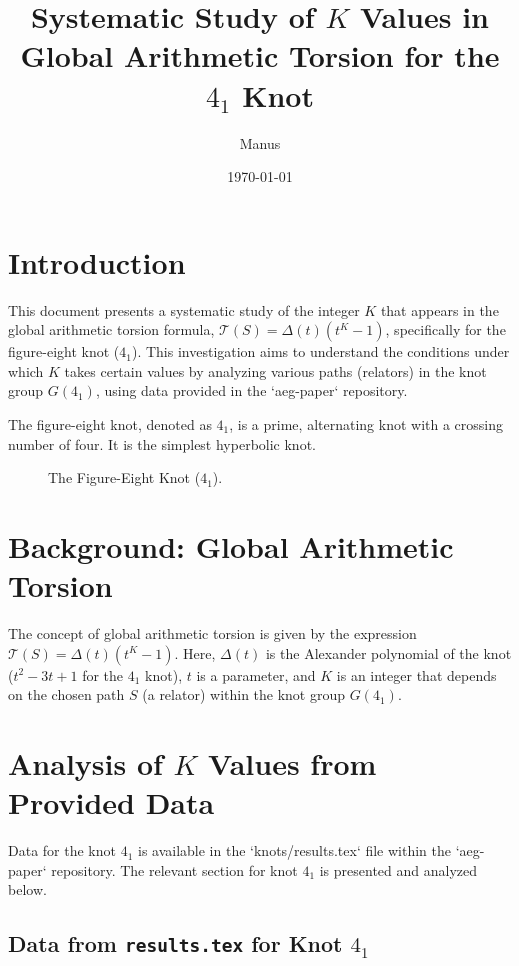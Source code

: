 \documentclass{article}
\title{Systematic Study of $K$ Values in Global Arithmetic Torsion for the $4_1$ Knot}
\author{Manus}
\date{\today}
\begin{document}
\maketitle

\section{Introduction}
This document presents a systematic study of the integer $K$ that appears in the global arithmetic torsion formula, $\mathcal{T}(S) = \Delta(t)(t^K-1)$, specifically for the figure-eight knot ($4_1$). This investigation aims to understand the conditions under which $K$ takes certain values by analyzing various paths (relators) in the knot group $G(4_1)$, using data provided in the `aeg-paper` repository.

The figure-eight knot, denoted as $4_1$, is a prime, alternating knot with a crossing number of four. It is the simplest hyperbolic knot.

\begin{figure}[h!]
    \centering
     
    \caption{The Figure-Eight Knot ($4_1$).}
    \label{fig:knot_4_1}
\end{figure}

\section{Background: Global Arithmetic Torsion}
The concept of global arithmetic torsion is given by the expression $\mathcal{T}(S) = \Delta(t)(t^K-1)$. Here, $\Delta(t)$ is the Alexander polynomial of the knot ($t^2 - 3t + 1$ for the $4_1$ knot), $t$ is a parameter, and $K$ is an integer that depends on the chosen path $S$ (a relator) within the knot group $G(4_1)$.

\section{Analysis of $K$ Values from Provided Data}

Data for the knot $4_1$ is available in the `knots/results.tex` file within the `aeg-paper` repository. The relevant section for knot $4_1$ is presented and analyzed below.

\subsection{Data from \texttt{results.tex} for Knot $4_1$}
\end{document}
